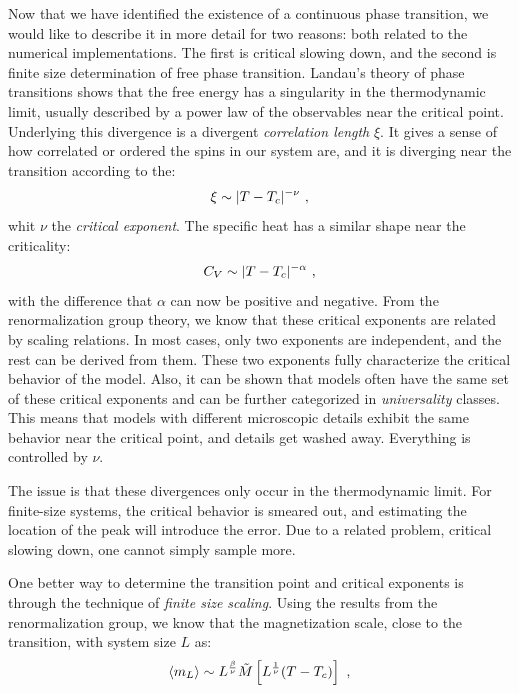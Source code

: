 \par
Now that we have identified the existence of a continuous phase transition, we would like to describe it in more detail for two reasons: both related to the numerical implementations. The first is critical slowing down, and the second is finite size determination of free phase transition. Landau's theory of phase transitions shows that the free energy has a singularity in the thermodynamic limit, usually described by a power law of the observables near the critical point. Underlying this divergence is a divergent \textit{correlation length} $\xi$. It gives a sense of how correlated or ordered the spins in our system are, and it is diverging near the transition according to the:
\begin{equation}
	\xi \sim |T - T_c|^{-\nu} \ ,
\end{equation}
whit $\nu$ the \textit{critical exponent}. The specific heat has a similar shape near the criticality:
\begin{equation}
	C_V \sim |T-T_c|^{-\alpha} \ ,
\end{equation}
with the difference that $\alpha$ can now be positive and negative. From the renormalization group theory, we know that these critical exponents are related by scaling relations. In most cases, only two exponents are independent, and the rest can be derived from them\cite{newman1999monte}. These two exponents fully characterize the critical behavior of the model. Also, it can be shown that models often have the same set of these critical exponents and can be further categorized in \textit{universality} classes. This means that models with different microscopic details exhibit the same behavior near the critical point, and details get washed away. Everything is controlled by $\nu$.
\par
The issue is that these divergences only occur in the thermodynamic limit. For finite-size systems, the critical behavior is smeared out, and estimating the location of the peak will introduce the error. Due to a related problem, critical slowing down, one cannot simply sample more\cite{newman1999monte}. 
\par
One better way to determine the transition point and critical exponents is through the technique of \textit{finite size scaling}. Using the results from the renormalization group, we know that the magnetization scale, close to the transition, with system size $L$ as:
\begin{equation}
	\expval{m_L} \sim L^{\frac{\beta}{\nu}}\tilde{M}\left[L^{\frac{1}{\nu}}(T-T_c)\right] \ ,
	\label{eq:magScaling}
\end{equation}
